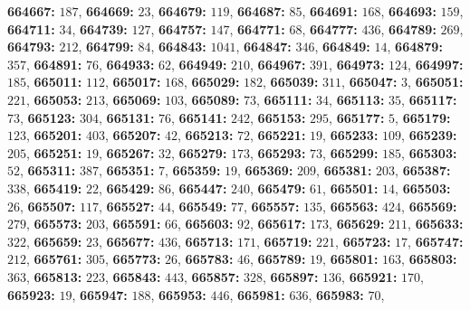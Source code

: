 \textsf{\bfseries 664667:} $187$, \textsf{\bfseries 664669:} $23$, \textsf{\bfseries 664679:} $119$, \textsf{\bfseries 664687:} $85$, \textsf{\bfseries 664691:} $168$, \textsf{\bfseries 664693:} $159$, \textsf{\bfseries 664711:} $34$, \textsf{\bfseries 664739:} $127$, \textsf{\bfseries 664757:} $147$, \textsf{\bfseries 664771:} $68$, \textsf{\bfseries 664777:} $436$, \textsf{\bfseries 664789:} $269$, \textsf{\bfseries 664793:} $212$, \textsf{\bfseries 664799:} $84$, \textsf{\bfseries 664843:} $1041$, \textsf{\bfseries 664847:} $346$, \textsf{\bfseries 664849:} $14$, \textsf{\bfseries 664879:} $357$, \textsf{\bfseries 664891:} $76$, \textsf{\bfseries 664933:} $62$, \textsf{\bfseries 664949:} $210$, \textsf{\bfseries 664967:} $391$, \textsf{\bfseries 664973:} $124$, \textsf{\bfseries 664997:} $185$, \textsf{\bfseries 665011:} $112$, \textsf{\bfseries 665017:} $168$, \textsf{\bfseries 665029:} $182$, \textsf{\bfseries 665039:} $311$, \textsf{\bfseries 665047:} $3$, \textsf{\bfseries 665051:} $221$, \textsf{\bfseries 665053:} $213$, \textsf{\bfseries 665069:} $103$, \textsf{\bfseries 665089:} $73$, \textsf{\bfseries 665111:} $34$, \textsf{\bfseries 665113:} $35$, \textsf{\bfseries 665117:} $73$, \textsf{\bfseries 665123:} $304$, \textsf{\bfseries 665131:} $76$, \textsf{\bfseries 665141:} $242$, \textsf{\bfseries 665153:} $295$, \textsf{\bfseries 665177:} $5$, \textsf{\bfseries 665179:} $123$, \textsf{\bfseries 665201:} $403$, \textsf{\bfseries 665207:} $42$, \textsf{\bfseries 665213:} $72$, \textsf{\bfseries 665221:} $19$, \textsf{\bfseries 665233:} $109$, \textsf{\bfseries 665239:} $205$, \textsf{\bfseries 665251:} $19$, \textsf{\bfseries 665267:} $32$, \textsf{\bfseries 665279:} $173$, \textsf{\bfseries 665293:} $73$, \textsf{\bfseries 665299:} $185$, \textsf{\bfseries 665303:} $52$, \textsf{\bfseries 665311:} $387$, \textsf{\bfseries 665351:} $7$, \textsf{\bfseries 665359:} $19$, \textsf{\bfseries 665369:} $209$, \textsf{\bfseries 665381:} $203$, \textsf{\bfseries 665387:} $338$, \textsf{\bfseries 665419:} $22$, \textsf{\bfseries 665429:} $86$, \textsf{\bfseries 665447:} $240$, \textsf{\bfseries 665479:} $61$, \textsf{\bfseries 665501:} $14$, \textsf{\bfseries 665503:} $26$, \textsf{\bfseries 665507:} $117$, \textsf{\bfseries 665527:} $44$, \textsf{\bfseries 665549:} $77$, \textsf{\bfseries 665557:} $135$, \textsf{\bfseries 665563:} $424$, \textsf{\bfseries 665569:} $279$, \textsf{\bfseries 665573:} $203$, \textsf{\bfseries 665591:} $66$, \textsf{\bfseries 665603:} $92$, \textsf{\bfseries 665617:} $173$, \textsf{\bfseries 665629:} $211$, \textsf{\bfseries 665633:} $322$, \textsf{\bfseries 665659:} $23$, \textsf{\bfseries 665677:} $436$, \textsf{\bfseries 665713:} $171$, \textsf{\bfseries 665719:} $221$, \textsf{\bfseries 665723:} $17$, \textsf{\bfseries 665747:} $212$, \textsf{\bfseries 665761:} $305$, \textsf{\bfseries 665773:} $26$, \textsf{\bfseries 665783:} $46$, \textsf{\bfseries 665789:} $19$, \textsf{\bfseries 665801:} $163$, \textsf{\bfseries 665803:} $363$, \textsf{\bfseries 665813:} $223$, \textsf{\bfseries 665843:} $443$, \textsf{\bfseries 665857:} $328$, \textsf{\bfseries 665897:} $136$, \textsf{\bfseries 665921:} $170$, \textsf{\bfseries 665923:} $19$, \textsf{\bfseries 665947:} $188$, \textsf{\bfseries 665953:} $446$, \textsf{\bfseries 665981:} $636$, \textsf{\bfseries 665983:} $70$, 
